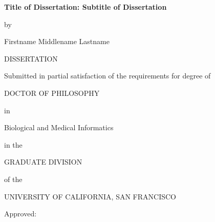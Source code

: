 
\begin{titlepage}
\begin{center}
    \singlespacing
    \vspace*{0.5in}
    
    {\Large \bfseries Title of Dissertation: Subtitle of Dissertation\par}
    
    \vspace{0.8in}
    
    by\par
    
    \vspace{0.2in}
    
    {\large Firstname Middlename Lastname}\par
    
    \vspace{0.8in}
    
    DISSERTATION\par
    \vspace{0.2in}
    Submitted in partial satisfaction of the requirements for degree of\par
    \vspace{0.2in}
    DOCTOR OF PHILOSOPHY\par
    \vspace{0.2in}
    in\par
    \vspace{0.2in}
    Biological and Medical Informatics\par
    \vspace{0.2in}
    in the\par
    \vspace{0.2in}
    GRADUATE DIVISION\par
    \vspace{0.2in}
    of the\par
    \vspace{0.2in}
    UNIVERSITY OF CALIFORNIA, SAN FRANCISCO\par
    
    \vfill
    
    Approved:\par
    \vspace{0.4in}
    

\end{center}
\end{titlepage}
